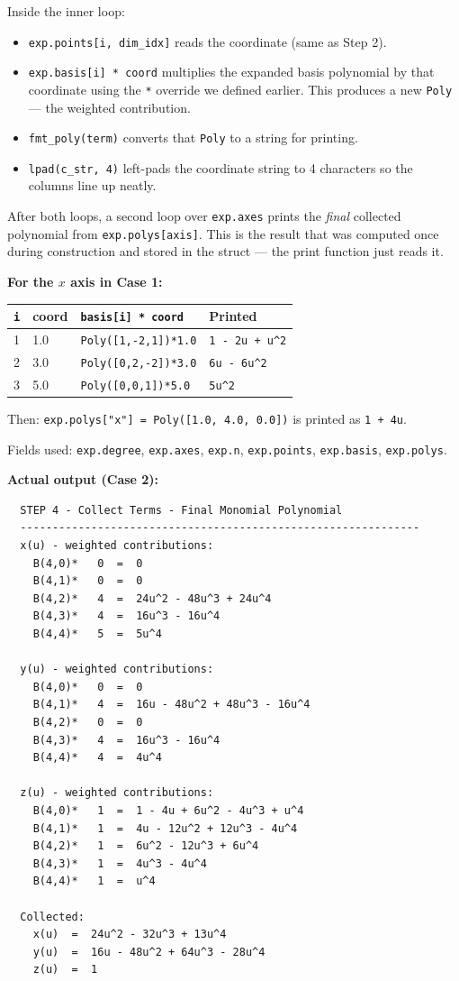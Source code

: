 \documentclass[12pt, a4paper]{article}
\newcommand{\cd}[1]{\texttt{#1}}
\begin{document}
Inside the inner loop:
\begin{itemize}
  \item \cd{exp.points[i, dim\_idx]} reads the coordinate (same as Step 2).
  \item \cd{exp.basis[i] * coord} multiplies the expanded basis
        polynomial by that coordinate using the \cd{*} override
        we defined earlier.
        This produces a new \cd{Poly} --- the weighted contribution.
  \item \cd{fmt\_poly(term)} converts that \cd{Poly} to a string
        for printing.
  \item \cd{lpad(c\_str, 4)} left-pads the coordinate string to
        4 characters so the columns line up neatly.
\end{itemize}

After both loops, a second loop over \cd{exp.axes} prints the
\emph{final} collected polynomial from \cd{exp.polys[axis]}.
This is the result that was computed once during construction
and stored in the struct --- the print function just reads it.

\begin{examplebox}
\textbf{For the $x$ axis in Case 1:}

\medskip
\begin{tabular}{llll}
\toprule
\cd{i} & coord & \cd{basis[i] * coord} & Printed \\
\midrule
1 & 1.0 & \cd{Poly([1,-2,1])*1.0} & \cd{1 - 2u + u\^{}2} \\
2 & 3.0 & \cd{Poly([0,2,-2])*3.0} & \cd{6u - 6u\^{}2} \\
3 & 5.0 & \cd{Poly([0,0,1])*5.0}  & \cd{5u\^{}2} \\
\bottomrule
\end{tabular}

\medskip
Then: \cd{exp.polys["x"] = Poly([1.0, 4.0, 0.0])} is printed as \cd{1 + 4u}.
\end{examplebox}

Fields used: \cd{exp.degree}, \cd{exp.axes}, \cd{exp.n},
\cd{exp.points}, \cd{exp.basis}, \cd{exp.polys}.

\textbf{Actual output (Case 2):}
\begin{verbatim}
  STEP 4 - Collect Terms - Final Monomial Polynomial
  --------------------------------------------------------------
  x(u) - weighted contributions:
    B(4,0)*   0  =  0
    B(4,1)*   0  =  0
    B(4,2)*   4  =  24u^2 - 48u^3 + 24u^4
    B(4,3)*   4  =  16u^3 - 16u^4
    B(4,4)*   5  =  5u^4

  y(u) - weighted contributions:
    B(4,0)*   0  =  0
    B(4,1)*   4  =  16u - 48u^2 + 48u^3 - 16u^4
    B(4,2)*   0  =  0
    B(4,3)*   4  =  16u^3 - 16u^4
    B(4,4)*   4  =  4u^4

  z(u) - weighted contributions:
    B(4,0)*   1  =  1 - 4u + 6u^2 - 4u^3 + u^4
    B(4,1)*   1  =  4u - 12u^2 + 12u^3 - 4u^4
    B(4,2)*   1  =  6u^2 - 12u^3 + 6u^4
    B(4,3)*   1  =  4u^3 - 4u^4
    B(4,4)*   1  =  u^4

  Collected:
    x(u)  =  24u^2 - 32u^3 + 13u^4
    y(u)  =  16u - 48u^2 + 64u^3 - 28u^4
    z(u)  =  1
\end{verbatim}
\end{document}
